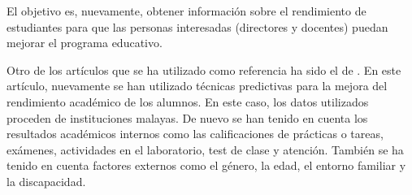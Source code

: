 
El objetivo es, nuevamente, obtener información sobre el rendimiento de estudiantes para que las personas interesadas (directores y docentes) puedan mejorar el programa educativo. %

Otro de los artículos que se ha utilizado como referencia ha sido el de . En este artículo, nuevamente se han utilizado técnicas predictivas para la mejora del rendimiento académico de los alumnos. En este caso, los datos utilizados proceden de instituciones malayas. De nuevo se han tenido en cuenta los resultados académicos internos como las calificaciones de prácticas o tareas, exámenes, actividades en el laboratorio, test de clase y atención. También se ha tenido en cuenta factores externos como el género, la edad, el entorno familiar y la discapacidad. 

